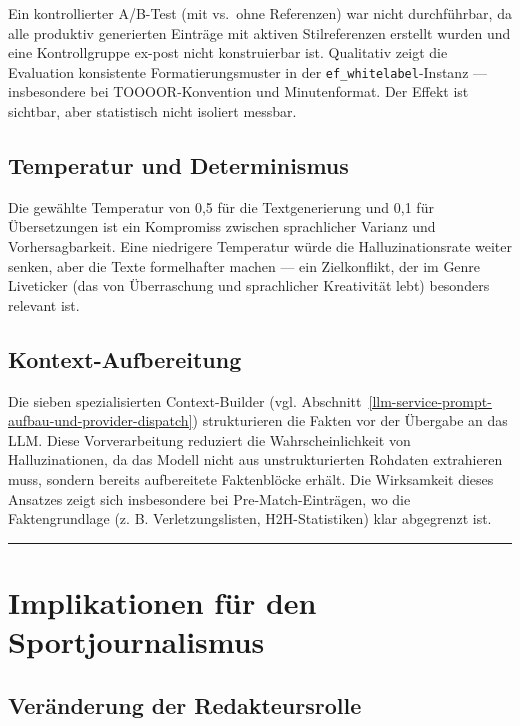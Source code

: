 Ein kontrollierter A/B-Test (mit vs.~ohne Referenzen) war nicht
durchführbar, da alle produktiv generierten Einträge mit aktiven
Stilreferenzen erstellt wurden und eine Kontrollgruppe ex-post nicht
konstruierbar ist. Qualitativ zeigt die Evaluation
konsistente Formatierungsmuster in der \texttt{ef\_whitelabel}-Instanz
--- insbesondere bei TOOOOR-Konvention und Minutenformat. Der Effekt ist
sichtbar, aber statistisch nicht isoliert messbar.

\subsection{Temperatur und
Determinismus}\label{temperatur-und-determinismus}

Die gewählte Temperatur von 0,5 für die Textgenerierung und 0,1 für
Übersetzungen ist ein Kompromiss zwischen sprachlicher Varianz und
Vorhersagbarkeit. Eine niedrigere Temperatur würde die
Halluzinationsrate weiter senken, aber die Texte formelhafter machen ---
ein Zielkonflikt, der im Genre Liveticker (das von Überraschung und
sprachlicher Kreativität lebt) besonders relevant ist.

\subsection{Kontext-Aufbereitung}\label{kontext-aufbereitung}

Die sieben spezialisierten Context-Builder (vgl. Abschnitt~\ref{llm-service-prompt-aufbau-und-provider-dispatch})
strukturieren die Fakten vor der Übergabe an das LLM. Diese
Vorverarbeitung reduziert die Wahrscheinlichkeit von Halluzinationen, da
das Modell nicht aus unstrukturierten Rohdaten extrahieren muss, sondern
bereits aufbereitete Faktenblöcke erhält. Die Wirksamkeit dieses
Ansatzes zeigt sich insbesondere bei Pre-Match-Einträgen, wo die
Faktengrundlage (z. B. Verletzungslisten, H2H-Statistiken) klar
abgegrenzt ist.

\begin{center}\rule{0.5\linewidth}{0.5pt}\end{center}

\section{Implikationen für den
Sportjournalismus}\label{implikationen-fuxfcr-den-sportjournalismus}

\subsection{Veränderung der
Redakteursrolle}\label{veruxe4nderung-der-redakteursrolle}

